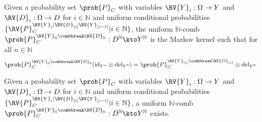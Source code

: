 \begin{definition}
Given a probability set $\prob{P}_C$ with variables $\RV{Y}_i:\Omega\to Y$ and $\RV{D}_i:\Omega\to D$ for $i\in \mathbb{N}$ and uniform conditional probabilities $\{\RV{P}_C^{\RV{Y}_i|\RV{D}_{[i]}\RV{Y}_{[i-1]}}|i\in \mathbb{N}\}$, the uniform $\mathbb{N}$-comb $\prob{P}_C^{\RV{Y}_{\mathbb{N}}\combbreak \RV{D}_{\mathbb{N}}}:D^\mathbb{N}\kto Y^\mathbb{N}$ is the Markov kernel such that for all $n\in \mathbb{N}$
\begin{align}
    \prob{P}_C^{\RV{Y}_{\mathbb{N}}\combbreak \RV{D}_{\mathbb{N}}}(\mathrm{id}_{Y^{n}}\otimes \mathrm{del}_{Y^{\mathbb{N}}}) &= \prob{P}_C^{\RV{Y}_{[n]}\combbreak \RV{D}_{[n]}}\otimes \mathrm{del}_{Y^{\mathbb{N}}}
\end{align}
\end{definition}

\begin{theorem}
Given a probability set $\prob{P}_C$ with variables $\RV{Y}_i:\Omega\to Y$ and $\RV{D}_i:\Omega\to D$ for $i\in \mathbb{N}$ and uniform conditional probabilities $\{\RV{P}_C^{\RV{Y}_i|\RV{D}_{[i]}\RV{Y}_{[i-1]}}|i\in \mathbb{N}\}$, a uniform $\mathbb{N}$-comb $\prob{P}_C^{\RV{Y}_{\mathbb{N}}\combbreak \RV{D}_{\mathbb{N}}}:D^\mathbb{N}\kto Y^\mathbb{N}$ exists.
\end{theorem}

